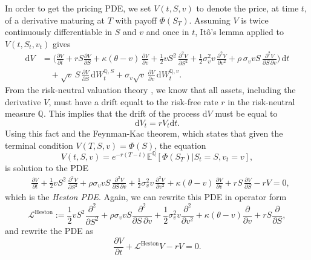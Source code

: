 \documentclass[12pt]{report} %
\theoremstyle{plain}           %
\theoremstyle{definition}      %
\theoremstyle{remark}          %
\begin{document}
In order to get the pricing PDE, we set $V(t,S,v)$ to denote the price, at time $t$, of a derivative maturing
at $T$ with payoff $\Phi(S_T)$. Assuming $V$ is twice continuously
differentiable in $S$ and $v$ and once in $t$, Itô's lemma applied to
$V(t, S_t, v_t)$ gives
\[
\begin{aligned}
\mathrm{d}V
&=
\Biggl(
      \frac{\partial V}{\partial t}
    + r S \frac{\partial V}{\partial S}
    + \kappa(\theta-v)\,\frac{\partial V}{\partial v}
    + \frac{1}{2} v S^{2}\,\frac{\partial^{2} V}{\partial S^{2}}
    + \frac{1}{2}\sigma_{v}^{2} v\,\frac{\partial^{2} V}{\partial v^{2}}
    + \rho\,\sigma_{v} v S\,\frac{\partial^{2} V}{\partial S\,\partial v}
\Biggr)\,\mathrm{d}t \\[6pt]
&\quad
  + \sqrt{v}\,S\,\frac{\partial V}{\partial S}\,
      \mathrm{d}W_{t}^{\mathbb{Q},S}
  + \sigma_{v}\sqrt{v}\,\frac{\partial V}{\partial v}\,
      \mathrm{d}W_{t}^{\mathbb{Q},v}.
\end{aligned}
\]
From the risk-neutral valuation theory \cite{björk2004arbitrage}, we know that all assets, including the derivative
$V$, must have a drift equalt to the risk-free rate $r$ in the risk-neutral measure $\mathbb{Q}$.
This implies that the drift of the process $\mathrm{d}V$ must be equal to
\begin{equation}
\mathrm{d}V_t = r V_t \mathrm{d}t.
\end{equation}
Using this fact and the Feynman-Kac theorem, which states that given the terminal condition $V(T,S,v)=\Phi(S)$, the equation
\begin{equation}\label{eq:FK_heston}
V(t,S,v) = e^{-r(T-t)}\mathbb{E}^{\mathbb{Q}}[\Phi(S_T)|S_t=S,v_t=v],
\end{equation}
is solution to the PDE
\begin{equation}\label{eq:heston_pde}
\begin{aligned}
  &\frac{\partial V}{\partial t}
  + \tfrac12 v S^{2}\,\frac{\partial^{2} V}{\partial S^{2}}
  + \rho\sigma_{v} v S\,\frac{\partial^{2} V}{\partial S\,\partial v}
  + \tfrac12\sigma_{v}^{2} v\,\frac{\partial^{2} V}{\partial v^{2}}
  + \kappa(\theta-v)\,\frac{\partial V}{\partial v}
  + r S\,\frac{\partial V}{\partial S}
  - r V
  = 0,
\end{aligned}
\end{equation}
which is the \emph{Heston PDE}. Again, we can rewrite this PDE in operator form
\begin{equation}\label{eq:L_Heston}
  \mathcal{L}^{\mathrm{Heston}}
  := \frac{1}{2}v S^{2}\frac{\partial^{2}}{\partial S^{2}}
  + \rho\sigma_{v} v S\frac{\partial^{2}}{\partial S\,\partial v}
  + \frac{1}{2}\sigma_{v}^{2} v\frac{\partial^{2}}{\partial v^{2}}
  + \kappa(\theta-v)\frac{\partial}{\partial v}		
  + r S\frac{\partial}{\partial S},
\end{equation}
and rewrite the PDE as
\begin{equation}\label{eq:heston_pde_redux}
  \frac{\partial V}{\partial t} + \mathcal{L}^{\mathrm{Heston}}V - rV = 0.
\end{equation}
\end{document}
